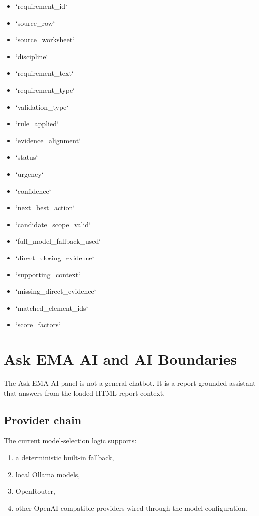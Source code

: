 \documentclass[10pt,letterpaper]{article}
\begin{document}
\begin{itemize}
  \item `requirement_id`
  \item `source_row`
  \item `source_worksheet`
  \item `discipline`
  \item `requirement_text`
  \item `requirement_type`
  \item `validation_type`
  \item `rule_applied`
  \item `evidence_alignment`
  \item `status`
  \item `urgency`
  \item `confidence`
  \item `next_best_action`
  \item `candidate_scope_valid`
  \item `full_model_fallback_used`
  \item `direct_closing_evidence`
  \item `supporting_context`
  \item `missing_direct_evidence`
  \item `matched_element_ids`
  \item `score_factors`
\end{itemize}

\section{Ask EMA AI and AI Boundaries}

The Ask EMA AI panel is not a general chatbot. It is a report-grounded assistant that answers from the loaded HTML report context.

\subsection{Provider chain}

The current model-selection logic supports:

\begin{enumerate}
  \item a deterministic built-in fallback,
  \item local Ollama models,
  \item OpenRouter,
  \item other OpenAI-compatible providers wired through the model configuration.
\end{enumerate}
\end{document}
